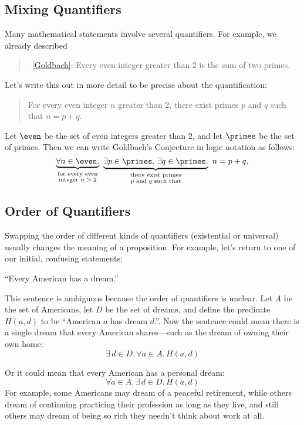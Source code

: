 \subsection{Mixing Quantifiers}

Many mathematical statements involve several quantifiers.  For
example, we already described
%
\begin{quote}
 ~\ref{Goldbach}: Every even integer
 greater than 2 is the sum of two primes.
\end{quote}
Let's write this out in more detail to be precise about the
quantification:
%
\begin{quote}
For every even integer $n$ greater than 2,
there exist primes $p$ and $q$ such that $n = p + q$.
\end{quote}
%
Let $\even$ be the set of even integers greater than 2, and let $\primes$ be the
set of primes.  Then we can write Goldbach's Conjecture in logic
notation as follows:
%
\[
\underbrace{\forall n \in \even.}_{\substack
    {\text{for every even} \\
     \text{integer $n > 2$}}}
\
\underbrace{\exists p \in \primes.\ \exists q \in \primes.}_{\substack
    {\text{there exist primes} \\
     \text{$p$ and $q$ such that}}}
\ n = p + q.
\]

\subsection{Order of Quantifiers}

Swapping the order of different kinds of quantifiers (existential or
universal) usually changes the meaning of a proposition.  For example,
let's return to one of our initial, confusing statements:
\begin{center}
``Every American has a dream.''
\end{center}

This sentence is ambiguous because the order of quantifiers is
unclear.  Let $A$ be the set of Americans, let $D$ be the set of
dreams, and define the predicate $H(a, d)$ to be ``American $a$ has
dream $d$.''.  Now the sentence could mean there is a single dream
that every American shares---such as the dream of owning their own
home:
\[
\exists\, d \in D.\, \forall a \in A.\, H(a, d)
\]

Or it could mean that every American has a personal dream:
\[
\forall a \in A.\, \exists\, d \in D.\, H(a, d)
\]
For example, some Americans may dream of a peaceful retirement, while
others dream of continuing practicing their profession as long as they
live, and still others may dream of being so rich they needn't think
about work at all.

